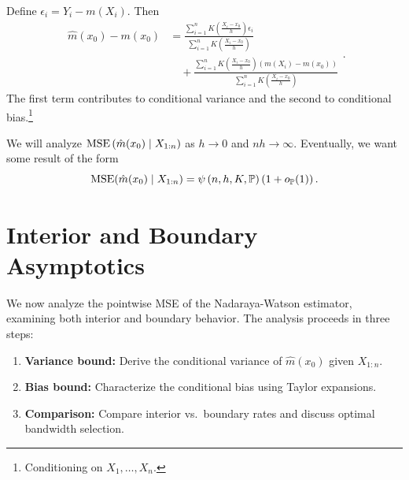 Define $\epsilon_i = Y_i - m(X_i)$. Then
\[
	\begin{aligned}
		\hat{m}(x_0) - m(x_0)
		&= \frac{\sum\limits_{i=1}^{n} K\left( \frac{X_i - x_0}{h}\right)\epsilon_i}{\sum\limits_{i=1}^{n} K\left( \frac{X_i - x_0}{h} \right)} \\
		&\quad + \frac{\sum\limits_{i=1}^{n} K\left( \frac{X_i - x_0}{h} \right)\left( m(X_i) - m(x_0) \right)}{\sum\limits_{i=1}^{n} K\left( \frac{X_i - x_0}{h} \right)}
	\end{aligned}
.\] 
The first term contributes to conditional variance and the second to conditional bias.\footnote{Conditioning on $X_1,\ldots,X_n$.}

We will analyze $\operatorname{MSE} \left( \hat{m}(x_0) \mid X_{1:n} \right)$ as $h\to 0$ and $nh \to \infty$. Eventually, we want some result of the form \[
	\operatorname{MSE}(\hat{m}(x_0) \mid X_{1:n}) = \psi\left( n,h,K, \mathbb{P} \right) \left( 1+o_{\mathbb{P}}(1) \right)
.\] 

\section{Interior and Boundary Asymptotics}



We now analyze the pointwise MSE of the Nadaraya-Watson estimator, examining both interior and boundary behavior. The analysis proceeds in three steps:
\begin{enumerate}
	\item \textbf{Variance bound:} Derive the conditional variance of $\hat{m}(x_0)$ given $X_{1:n}$.
	\item \textbf{Bias bound:} Characterize the conditional bias using Taylor expansions.
	\item \textbf{Comparison:} Compare interior vs.\ boundary rates and discuss optimal bandwidth selection.
\end{enumerate}

